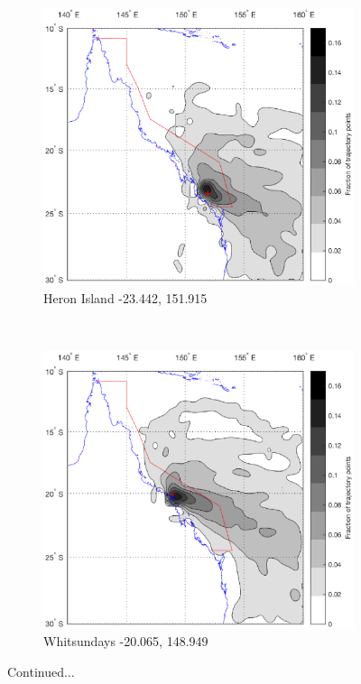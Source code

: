 \begin{figure}[!hbt]
    \centering
    \begin{subfigure}[b]{0.45\textwidth}
	    \includegraphics[width=\textwidth]{Fig/Research/BT_Coast/Map_101.eps}
	    \caption{Heron Island -23.442, 151.915}
	    \label{subfig:whit}
    \end{subfigure}
    ~
    \begin{subfigure}[b]{0.45\textwidth}
    	\includegraphics[width=\textwidth]{Fig/Research/BT_Coast/Map_102.eps}
	    \caption{Whitsundays -20.065, 148.949}
	    \label{subfig:aims}
    \end{subfigure}
    \caption{Continued...}
    \label{fig:btcoastlucjet}
\end{figure}

